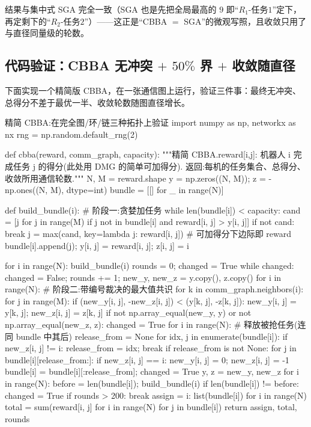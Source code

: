 结果与集中式 SGA 完全一致（SGA 也是先把全局最高的 $9$ 即“$R_1$-任务$1$”定下，再定剩下的“$R_2$-任务$2$”）——这正是“CBBA $=$ SGA”的微观写照，且收敛只用了与直径同量级的轮数。

\subsection{代码验证：CBBA 无冲突 \texorpdfstring{$+$}{+} \texorpdfstring{$50\%$}{50} 界 \texorpdfstring{$+$}{+} 收敛随直径}
\label{sec:mapf-cbba-code}

下面实现一个精简版 CBBA，在一张通信图上运行，验证三件事：最终无冲突、总得分不差于最优一半、收敛轮数随图直径增长。

\begin{codebox}[Python]{精简 CBBA:在完全图/环/链三种拓扑上验证}
import numpy as np, networkx as nx
rng = np.random.default_rng(2)

def cbba(reward, comm_graph, capacity):
    """精简 CBBA.reward[i,j]: 机器人 i 完成任务 j 的得分(此处用 DMG 的简单可加得分).
    返回:每机的任务集合、总得分、收敛所用通信轮数."""
    N, M = reward.shape
    y = np.zeros((N, M)); z = -np.ones((N, M), dtype=int)
    bundle = [[] for _ in range(N)]

    def build_bundle(i):                                   # 阶段一:贪婪加任务
        while len(bundle[i]) < capacity:
            cand = [j for j in range(M) if j not in bundle[i] and reward[i, j] > y[i, j]]
            if not cand: break
            j = max(cand, key=lambda j: reward[i, j])      # 可加得分下边际即 reward
            bundle[i].append(j); y[i, j] = reward[i, j]; z[i, j] = i

    for i in range(N): build_bundle(i)
    rounds = 0; changed = True
    while changed:
        changed = False; rounds += 1; new_y, new_z = y.copy(), z.copy()
        for i in range(N):                                 # 阶段二:带编号裁决的最大值共识
            for k in comm_graph.neighbors(i):
                for j in range(M):
                    if (new_y[i, j], -new_z[i, j]) < (y[k, j], -z[k, j]):
                        new_y[i, j] = y[k, j]; new_z[i, j] = z[k, j]
        if not np.array_equal(new_y, y) or not np.array_equal(new_z, z): changed = True
        for i in range(N):                                 # 释放被抢任务(连同 bundle 中其后)
            release_from = None
            for idx, j in enumerate(bundle[i]):
                if new_z[i, j] != i: release_from = idx; break
            if release_from is not None:
                for j in bundle[i][release_from:]:
                    if new_z[i, j] == i: new_y[i, j] = 0; new_z[i, j] = -1
                bundle[i] = bundle[i][:release_from]; changed = True
        y, z = new_y, new_z
        for i in range(N):
            before = len(bundle[i]); build_bundle(i)
            if len(bundle[i]) != before: changed = True
        if rounds > 200: break
    assign = {i: list(bundle[i]) for i in range(N)}
    total = sum(reward[i, j] for i in range(N) for j in bundle[i])
    return assign, total, rounds


\end{codebox}

